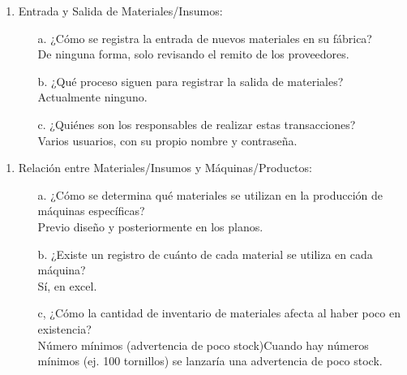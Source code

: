 \documentclass{article}
\begin{document}
    \begin{enumerate}[start=3]
        \item Entrada y Salida de Materiales/Insumos:
            \begin{enumerate}[label=\Alph*.]
                \item[a.]  ¿Cómo se registra la entrada de nuevos materiales en su fábrica? \\
                    De ninguna forma, solo revisando el remito de los proveedores.
                \item[b.] ¿Qué proceso siguen para registrar la salida de materiales? \\
                	Actualmente ninguno.
                \item[c.] ¿Quiénes son los responsables de realizar estas transacciones? \\
                    Varios usuarios, con su propio nombre y contraseña.
            \end{enumerate}
    \end{enumerate}

    \begin{enumerate}[start=4]
        \item Relación entre Materiales/Insumos y Máquinas/Productos:
            \begin{enumerate}[label=\Alph*.]
                \item[a.] ¿Cómo se determina qué materiales se utilizan en la producción de máquinas específicas? \\
                    Previo diseño y posteriormente en los planos.
                \item[b.]  ¿Existe un registro de cuánto de cada material se utiliza en cada máquina? \\
                    Sí, en excel.
                \item[c,] ¿Cómo la cantidad de inventario de materiales afecta al haber poco en existencia? \\
                    Número mínimos (advertencia de poco stock)Cuando hay números mínimos (ej. 100 tornillos) se lanzaría una advertencia de poco stock.
            \end{enumerate}
    \end{enumerate}
\end{document}
